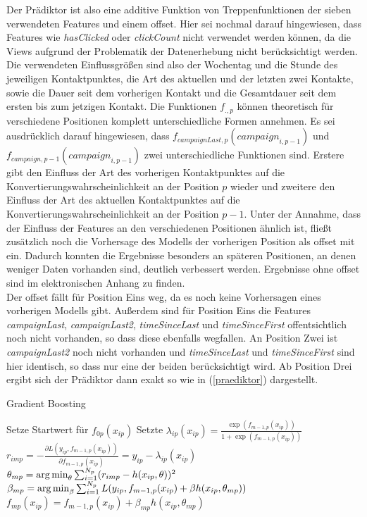 Der Prädiktor ist also eine additive Funktion von Treppenfunktionen der sieben verwendeten Features und einem offset. Hier sei nochmal darauf hingewiesen, dass Features wie \textit{hasClicked} oder \textit{clickCount} nicht verwendet werden können, da die Views aufgrund der Problematik der Datenerhebung nicht berücksichtigt werden. Die verwendeten Einflussgrößen sind also der Wochentag und die Stunde des jeweiligen Kontaktpunktes, die Art des aktuellen und der letzten zwei Kontakte, sowie die Dauer seit dem vorherigen Kontakt und die Gesamtdauer seit dem ersten bis zum jetzigen Kontakt. Die Funktionen $f_{.,p}$ können theoretisch für verschiedene Positionen komplett unterschiedliche Formen annehmen. Es sei ausdrücklich darauf hingewiesen, dass $f_{campaignLast,p}(\textit{campaign}_{i,p-1})$ und $f_{campaign,p-1}(\textit{campaign}_{i,p-1})$ zwei unterschiedliche Funktionen sind. Erstere gibt den Einfluss der Art des vorherigen Kontaktpunktes auf die Konvertierungswahrscheinlichkeit an der Position $p$ wieder und zweitere den Einfluss der Art des aktuellen Kontaktpunktes auf die Konvertierungswahrscheinlichkeit an der Position $p-1$. Unter der Annahme, dass der Einfluss der Features an den verschiedenen Positionen ähnlich ist, fließt zusätzlich noch die Vorhersage des Modells der vorherigen Position als offset mit ein. Dadurch konnten die Ergebnisse besonders an späteren Positionen, an denen weniger Daten vorhanden sind, deutlich verbessert werden. Ergebnisse ohne offset sind im elektronischen Anhang zu finden.\\
Der offset fällt für Position Eins weg, da es noch keine Vorhersagen eines vorherigen Modells gibt. Außerdem sind für Position Eins die Features \textit{campaignLast}, \textit{campaignLast2}, \textit{timeSinceLast} und \textit{timeSinceFirst} offentsichtlich noch nicht vorhanden, so dass diese ebenfalls wegfallen. An Position Zwei ist \textit{campaignLast2} noch nicht vorhanden und \textit{timeSinceLast} und \textit{timeSinceFirst} sind hier identisch, so dass nur eine der beiden berücksichtigt wird. Ab Position Drei ergibt sich der Prädiktor dann exakt so wie in (\ref{praediktor}) dargestellt.\\
\begin{algorithm}
\caption{Gradient Boosting}\label{alg}
\label{gradboosting}
\begin{algorithmic}
\STATE Setze Startwert für $f_{0p}(x_{ip})$
	\STATE Setzte $\lambda_{ip}(x_{ip}) = \frac{\exp(f_{m-1,p}(x_{ip}))}{1+\exp(f_{m-1,p}(x_{ip}))}$
		\STATE $r_{imp} = - \frac{\partial L(y_{ip},f_{m-1,p}(x_{ip}))}{\partial f_{m-1,p}(x_{ip})} = y_{ip} - \lambda_{ip}(x_{ip})$
	\ENDFOR
	\STATE $\theta_{mp} = \operatorname*{arg\,min}_{\theta} \sum_{i=1}^{N_p} (r_{imp} - h(x_{ip}, \theta))^2$
	\STATE $\beta_{mp} = \operatorname*{arg\,min}_{\beta} \sum_{i=1}^{N_p} L(y_{ip}, f_{m-1,p}(x_{ip}) + \beta h(x_{ip},\theta_{mp}))$
	\STATE $f_{mp}(x_{ip}) = f_{m-1,p}(x_{ip}) + \beta_{mp} h(x_{ip},\theta_{mp})$
\ENDFOR
\end{algorithmic}
\end{algorithm}
